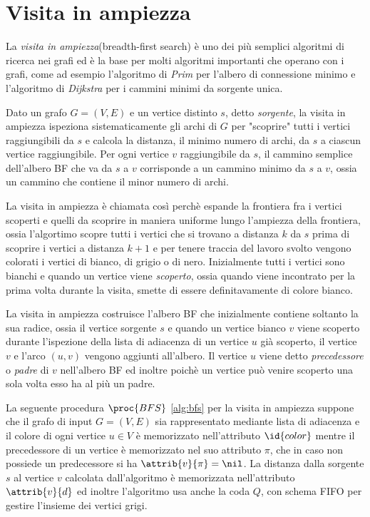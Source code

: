 \section{Visita in ampiezza}
La \emph{visita in ampiezza}(breadth-first search) è uno dei più semplici algoritmi di ricerca nei grafi ed è la base per molti algoritmi importanti che operano
con i grafi, come ad esempio l'algoritmo di \emph{Prim} per l'albero di connessione minimo e l'algoritmo di \emph{Dijkstra} per i cammini minimi da sorgente unica.

Dato un grafo $G = (V, E)$ e un vertice distinto $s$, detto \emph{sorgente}, la visita in ampiezza ispeziona sistematicamente gli archi di $G$ per "scoprire"
tutti i vertici raggiungibili da $s$ e calcola la distanza, il minimo numero di archi, da $s$ a ciascun vertice raggiungibile.\newline
Per ogni vertice $v$ raggiungibile da $s$, il cammino semplice dell'albero BF che va da $s$ a $v$ corrisponde a un cammino minimo da $s$ a $v$, ossia un cammino
che contiene il minor numero di archi.

La visita in ampiezza è chiamata così perchè espande la frontiera fra i vertici scoperti e quelli da scoprire in maniera uniforme lungo l'ampiezza della frontiera,
ossia l'algortimo scopre tutti i vertici che si trovano a distanza $k$ da $s$ prima di scoprire i vertici a distanza $k + 1$ e per tenere traccia del lavoro svolto
vengono colorati i vertici di bianco, di grigio o di nero.\newline
Inizialmente tutti i vertici sono bianchi e quando un vertice viene \emph{scoperto}, ossia quando viene incontrato per la prima volta durante la visita, 
smette di essere definitavamente di colore bianco.

La visita in ampiezza costruisce l'albero BF che inizialmente contiene soltanto la sua radice, ossia il vertice sorgente $s$ e quando un vertice bianco $v$
viene scoperto durante l'ispezione della lista di adiacenza di un vertice $u$ già scoperto, il vertice $v$ e l'arco $(u, v)$ vengono aggiunti all'albero.\newline
Il vertice $u$ viene detto \emph{precedessore} o \emph{padre} di $v$ nell'albero BF ed inoltre poichè un vertice può venire scoperto una sola volta esso ha al più un padre.

La seguente procedura $\proc{BFS}$ \ref{alg:bfs} per la visita in ampiezza suppone che il grafo di input $G = (V, E)$ sia rappresentato mediante lista di adiacenza e
il colore di ogni vertice $u \in V$ è memorizzato nell'attributo $\id{color}$ mentre il precedessore di un vertice è memorizzato nel suo attributo $\pi$, che in caso 
non possiede un predecessore si ha $\attrib{v}{\pi} = \nil$.\newline
La distanza dalla sorgente $s$ al vertice $v$ calcolata dall'algoritmo è memorizzata nell'attributo $\attrib{v}{d}$ ed inoltre l'algoritmo usa anche la coda $Q$, 
con schema FIFO per gestire l'insieme dei vertici grigi.

